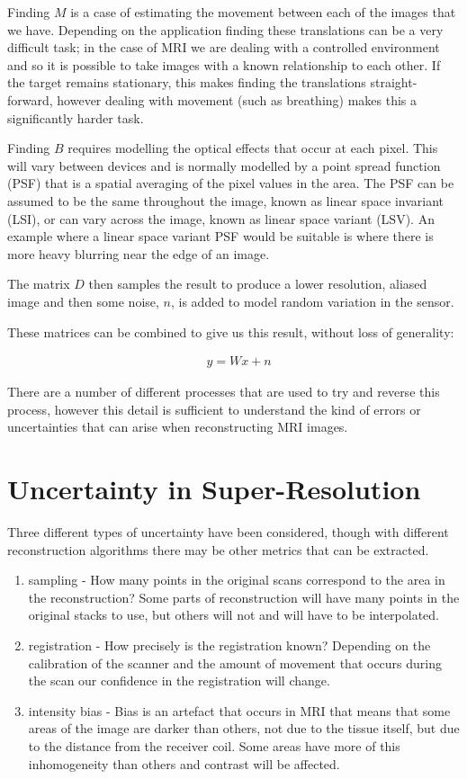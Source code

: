 Finding $M$ is a case of estimating the movement between each of the images that we have. Depending on the application finding these translations can be a very difficult task; in the case of MRI we are dealing with a controlled environment and so it is possible to take images with a known relationship to each other. If the target remains stationary, this makes finding the translations straight-forward, however dealing with movement (such as breathing) makes this a significantly harder task.

Finding $B$ requires modelling the optical effects that occur at each pixel. This will vary between devices and is normally modelled by a point spread function (PSF) that is a spatial averaging of the pixel values in the area. The PSF can be assumed to be the same throughout the image, known as linear space invariant (LSI), or can vary across the image, known as linear space variant (LSV). An example where a linear space variant PSF would be suitable is where there is more heavy blurring near the edge of an image.

The matrix $D$ then samples the result to produce a lower resolution, aliased image and then some noise, $n$, is added to model random variation in the sensor.

These matrices can be combined to give us this result, without loss of generality:

\begin{align}
& y = Wx + n \nonumber
\end{align}

There are a number of different processes that are used to try and reverse this process, however this detail is sufficient to understand the kind of errors or uncertainties that can arise when reconstructing MRI images.

\newpage
\section{Uncertainty in Super-Resolution}\label{background:uncertainty}
Three different types of uncertainty have been considered, though with different reconstruction algorithms there may be other metrics that can be extracted.

\begin{enumerate}
	\item sampling - How many points in the original scans correspond to the area in the reconstruction? Some parts of reconstruction will have many points in the original stacks to use, but others will not and will have to be interpolated.
	\item registration - How precisely is the registration known? Depending on the calibration of the scanner and the amount of movement that occurs during the scan our confidence in the registration will change.
	\item intensity bias - Bias is an artefact that occurs in MRI that means that some areas of the image are darker than others, not due to the tissue itself, but due to the distance from the receiver coil. Some areas have more of this inhomogeneity than others and contrast will be affected.
\end{enumerate}

